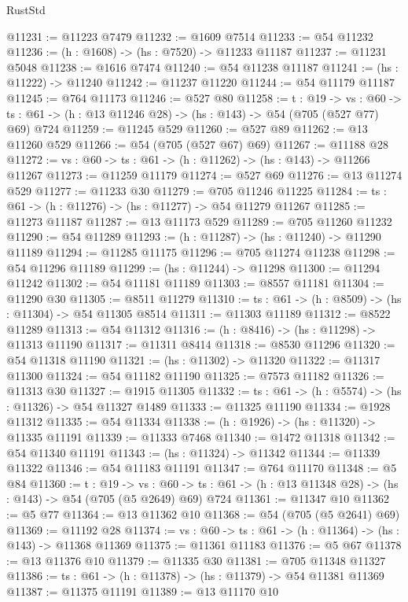 \begin{lexlean}{RustStd}
\begin{coremodule}
@11231 := @11223 @7479
@11232 := @1609 @7514
@11233 := @54 @11232
@11236 := (h : @1608) -> (hs : @7520) -> @11233 @11187
@11237 := @11231 @5048
@11238 := @1616 @7474
@11240 := @54 @11238 @11187
@11241 := (hs : @11222) -> @11240
@11242 := @11237 @11220
@11244 := @54 @11179 @11187
@11245 := @764 @11173
@11246 := @527 @80
@11258 := {t : @19} ->
  {vs : @60} -> {ts : @61} -> (h : @13 @11246 @28) -> (hs : @143) -> @54 (@705 (@527 @77) @69) @724
@11259 := @11245 @529
@11260 := @527 @89
@11262 := @13 @11260 @529
@11266 := @54 (@705 (@527 @67) @69)
@11267 := @11188 @28
@11272 := {vs : @60} -> {ts : @61} -> (h : @11262) -> (hs : @143) -> @11266 @11267
@11273 := @11259 @11179
@11274 := @527 @69
@11276 := @13 @11274 @529
@11277 := @11233 @30
@11279 := @705 @11246 @11225
@11284 := {ts : @61} -> (h : @11276) -> (hs : @11277) -> @54 @11279 @11267
@11285 := @11273 @11187
@11287 := @13 @11173 @529
@11289 := @705 @11260 @11232
@11290 := @54 @11289
@11293 := (h : @11287) -> (hs : @11240) -> @11290 @11189
@11294 := @11285 @11175
@11296 := @705 @11274 @11238
@11298 := @54 @11296 @11189
@11299 := (hs : @11244) -> @11298
@11300 := @11294 @11242
@11302 := @54 @11181 @11189
@11303 := @8557 @11181
@11304 := @11290 @30
@11305 := @8511 @11279
@11310 := {ts : @61} -> (h : @8509) -> (hs : @11304) -> @54 @11305 @8514
@11311 := @11303 @11189
@11312 := @8522 @11289
@11313 := @54 @11312
@11316 := (h : @8416) -> (hs : @11298) -> @11313 @11190
@11317 := @11311 @8414
@11318 := @8530 @11296
@11320 := @54 @11318 @11190
@11321 := (hs : @11302) -> @11320
@11322 := @11317 @11300
@11324 := @54 @11182 @11190
@11325 := @7573 @11182
@11326 := @11313 @30
@11327 := @1915 @11305
@11332 := {ts : @61} -> (h : @5574) -> (hs : @11326) -> @54 @11327 @1489
@11333 := @11325 @11190
@11334 := @1928 @11312
@11335 := @54 @11334
@11338 := (h : @1926) -> (hs : @11320) -> @11335 @11191
@11339 := @11333 @7468
@11340 := @1472 @11318
@11342 := @54 @11340 @11191
@11343 := (hs : @11324) -> @11342
@11344 := @11339 @11322
@11346 := @54 @11183 @11191
@11347 := @764 @11170
@11348 := @5 @84
@11360 := {t : @19} ->
  {vs : @60} -> {ts : @61} -> (h : @13 @11348 @28) -> (hs : @143) -> @54 (@705 (@5 @2649) @69) @724
@11361 := @11347 @10
@11362 := @5 @77
@11364 := @13 @11362 @10
@11368 := @54 (@705 (@5 @2641) @69)
@11369 := @11192 @28
@11374 := {vs : @60} -> {ts : @61} -> (h : @11364) -> (hs : @143) -> @11368 @11369
@11375 := @11361 @11183
@11376 := @5 @67
@11378 := @13 @11376 @10
@11379 := @11335 @30
@11381 := @705 @11348 @11327
@11386 := {ts : @61} -> (h : @11378) -> (hs : @11379) -> @54 @11381 @11369
@11387 := @11375 @11191
@11389 := @13 @11170 @10

\end{coremodule}
\end{lexlean}
